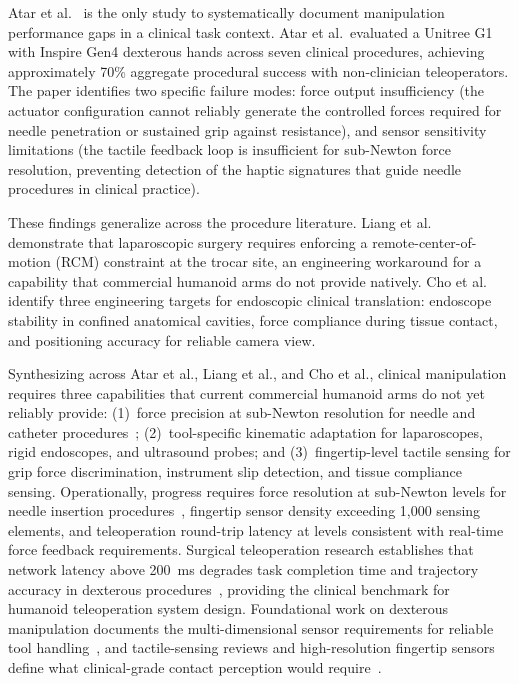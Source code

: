 \documentclass[acmsmall]{acmart}
\begin{document}
Atar et al.~\cite{atar2025humanoids} is the only study to systematically document
manipulation performance gaps in a clinical task context. Atar et al.\ evaluated
a Unitree G1 with Inspire Gen4 dexterous hands across seven clinical procedures,
achieving approximately 70\% aggregate procedural success with non-clinician
teleoperators. The paper identifies two specific failure modes: force output
insufficiency (the actuator configuration cannot reliably generate the controlled
forces required for needle penetration or sustained grip against resistance), and
sensor sensitivity limitations (the tactile feedback loop is insufficient for
sub-Newton force resolution, preventing detection of the haptic signatures that
guide needle procedures in clinical practice).

These findings generalize across the procedure literature. Liang et
al.~\cite{liang2025lapsurgie} demonstrate that laparoscopic surgery requires
enforcing a remote-center-of-motion (RCM) constraint at the trocar site, an
engineering workaround for a capability that commercial humanoid arms do not
provide natively. Cho et al.~\cite{cho2026humanoid} identify three engineering
targets for endoscopic clinical translation: endoscope stability in confined
anatomical cavities, force compliance during tissue contact, and positioning
accuracy for reliable camera view.

Synthesizing across Atar et al., Liang et al., and Cho et al., clinical manipulation requires three
capabilities that current commercial humanoid arms do not yet reliably provide:
(1)~force precision at sub-Newton resolution for needle and catheter
procedures~\cite{atar2025humanoids}; (2)~tool-specific kinematic adaptation for
laparoscopes, rigid endoscopes, and ultrasound probes; and (3)~fingertip-level
tactile sensing for grip force discrimination, instrument slip detection, and
tissue compliance sensing. Operationally, progress requires force resolution at
sub-Newton levels for needle insertion procedures~\cite{atar2025humanoids},
fingertip sensor density exceeding 1,000 sensing elements, and teleoperation
round-trip latency at levels consistent with real-time force feedback
requirements. Surgical teleoperation research establishes that network latency
above 200~ms degrades task completion time and trajectory accuracy in
dexterous procedures~\cite{lum2009latency,xu2014latency,motiwala2025telesurgery},
providing the clinical benchmark for humanoid teleoperation system design.
Foundational work on dexterous manipulation documents the multi-dimensional
sensor requirements for reliable tool handling~\cite{okamura2000dexterous}, and
tactile-sensing reviews and high-resolution fingertip sensors define what
clinical-grade contact perception would
require~\cite{kappassov2015tactile,yuan2017gelsight}.
\end{document}
